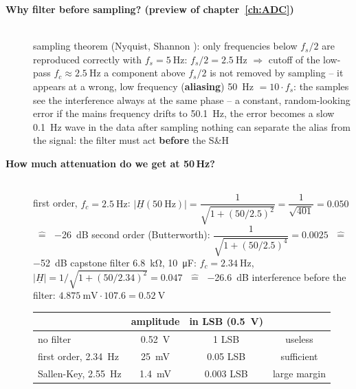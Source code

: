 \begin{description}
\item[{\rot\bf Why filter before sampling? (preview of chapter~\ref{ch:ADC})}]~\\[-\lblskip]
\bi
	\ite sampling theorem (Nyquist, Shannon \cite{shannon1949}): only frequencies below $f_s/2$ are reproduced correctly
	\ite with $f_s = \SI{5}{\hertz}$: $f_s/2 = \SI{2.5}{\hertz}$ $\Rightarrow$ cutoff of the low-pass $f_c \approx \SI{2.5}{\hertz}$
	\ite a component above $f_s/2$ is not removed by sampling -- it appears at a wrong, low frequency (\textbf{aliasing})
	\itee \SI{50}{\hertz} $= 10\cdot f_s$: the samples see the interference always at the same phase -- a constant, random-looking error
	\itee if the mains frequency drifts to \SI{50.1}{\hertz}, the error becomes a slow \SI{0.1}{\hertz} wave in the data
	\ite after sampling nothing can separate the alias from the signal: the filter must act \textbf{before} the S\&H
\ei
\os{\newpage}

\item[{\rot\bf How much attenuation do we get at 50\,Hz?}]~\\[-\lblskip]
\bi
	\ite first order, $f_c = \SI{2.5}{\hertz}$: $|\underline{H}(\SI{50}{\hertz})| = \dfrac{1}{\sqrt{1+(50/2.5)^2}} = \dfrac{1}{\sqrt{401}} = 0.050$ $\;\hat{=}\;$ \SI{-26}{\deci\bel}
	\ite second order (Butterworth): $\dfrac{1}{\sqrt{1+(50/2.5)^4}} = 0.0025$ $\;\hat{=}\;$ \SI{-52}{\deci\bel}
	\ite capstone filter \SI{6.8}{\kilo\ohm}, \SI{10}{\micro\farad}: $f_c = \SI{2.34}{\hertz}$, $|\underline{H}| = 1/\sqrt{1+(50/2.34)^2} = 0.047$ $\;\hat{=}\;$ \SI{-26.6}{\deci\bel}
	\ite interference before the filter: $\SI{4.875}{\milli\volt}\cdot 107.6 = \SI{0.52}{\volt}$
\ei
\begin{center}
\begin{tabular}{lccc}
\toprule
 & amplitude & in LSB (\SI{0.5}{\volt}) & \\
\midrule
no filter & \SI{0.52}{\volt} & 1 LSB & useless \\
first order, \SI{2.34}{\hertz} & \SI{25}{\milli\volt} & 0.05 LSB & sufficient \\
Sallen-Key, \SI{2.55}{\hertz} & \SI{1.4}{\milli\volt} & 0.003 LSB & large margin \\
\bottomrule
\end{tabular}
\end{center}
\os{\newpage}


\end{description}
